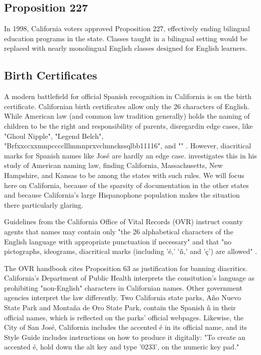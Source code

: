\subsection{Proposition 227}

In 1998, California voters approved Proposition 227, effectively ending
bilingual education programs in the state. Classes taught in a bilingual setting
would be replaced with nearly monolingual English classes designed for English
learners.

\subsection{Birth Certificates}

A modern battlefield for official Spanish recognition in California is on the
birth certificate. Californian birth certificates allow only the 26 characters
of English. While American law (and common law tradition generally) holds the
naming of children to be the right and responsibility of parents, disregardin
edge cases, like "Ghoul Nipple", "Legend Belch",
"Brfxxccxxmnpcccclllmmnprxvclmnckssqlbb11116", and "" \parencite{larson11}.
However, diacritical marks for Spanish names like José are hardly an edge case.
\textcite[5]{larson11} investigates this in his study of American naming law,
finding California, Massachusetts, New Hampshire, and Kansas to be among the
states with such rules. We will focus here on California, because of the
sparsity of documentation in the other states and because California's large
Hispanophone population makes the situation there particularly glaring.

Guidelines from the California Office of Vital Records (OVR) instruct county
agents that names may contain only "the 26 alphabetical characters of the
English language with appropriate punctuation if necessary" and that "no
pictographs, ideograms, diacritical marks (including 'é,' 'ñ,' and 'ç') are
allowed" \parencite{larson11}.

The OVR handbook cites Proposition 63 as justification for banning diacritics.
California's Department of Public Health interprets the consitution's language
as prohibiting "non-English" characters in Californian names. Other government
agencies interpret the law differently. Two California state parks, Año Nuevo
State Park and Montaña de Oro State Park, contain the Spanish ñ in their
official names, which is reflected on the parks' official webpages.
\parencite{año-nuevo} \parencite{montaña-de-oro} Likewise, the City of San José,
California includes the accented é in its official name, and its Style Guide
includes instructions on how to produce it digitally: "To create an accented é,
hold down the alt key and type '0233'‚ on the numeric key pad."
\textcite{san-josé}

